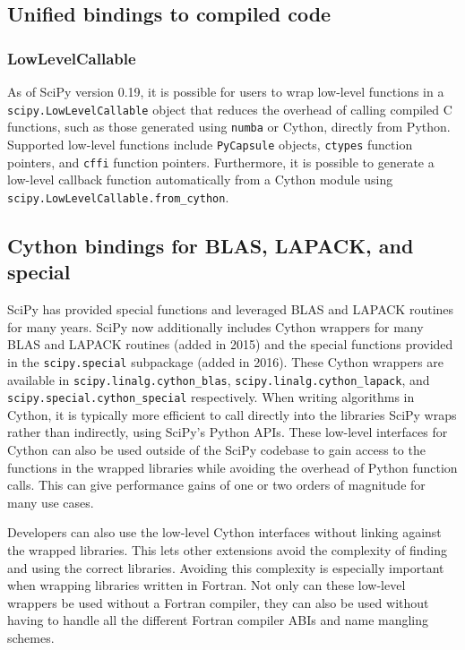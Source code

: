 \documentclass[fleqn,10pt]{wlscirep}
\begin{document}


\subsection*{Unified bindings to compiled code}

\subsubsection*{LowLevelCallable}

As of SciPy version 0.19, it is possible for users to wrap low-level functions
in a \texttt{scipy.LowLevelCallable} object that reduces the overhead of
calling compiled C functions, such as those generated using \texttt{numba}
or Cython, directly from Python.
Supported low-level functions include \texttt{PyCapsule}
objects, \texttt{ctypes} function pointers, and \texttt{cffi} function pointers.
Furthermore, it is possible to generate a low-level callback function
automatically from a Cython module using \texttt{scipy.LowLevelCallable.from\_cython}.

\subsection*{Cython bindings for BLAS, LAPACK, and special}

SciPy has provided special functions and leveraged BLAS and
LAPACK\cite{LAPACK} routines for many years. SciPy now additionally
includes Cython\cite{behnel2011cython} wrappers for
many BLAS and LAPACK routines (added in 2015) and the special functions 
provided in the \texttt{scipy.{\allowbreak}special} subpackage (added in 2016).
These Cython wrappers are available in 
\texttt{scipy.{\allowbreak}linalg.{\allowbreak}cython\_blas},
\texttt{scipy.{\allowbreak}linalg.{\allowbreak}cython\_lapack}, and
\texttt{scipy.{\allowbreak}special.{\allowbreak}cython\_special} respectively.
When writing algorithms in Cython, it is typically more efficient to call
directly into the libraries SciPy wraps rather than indirectly, using SciPy's
Python APIs.  These low-level interfaces for Cython can also be used outside of
the SciPy codebase to gain access to the functions in the wrapped libraries
while avoiding the overhead of Python function calls.  This can give
performance gains of one or two orders of magnitude for many use cases.

Developers can also use the low-level Cython interfaces without linking against
the wrapped libraries\cite{blas-lapack-wrappers-scipy-2015}.  This lets other
extensions avoid the complexity of finding and using the correct libraries.
Avoiding this complexity is especially important when wrapping libraries
written in Fortran.  Not only can these low-level wrappers be used without a
Fortran compiler, they can also be used without having to handle all the
different Fortran compiler ABIs and name mangling schemes.
\end{document}
